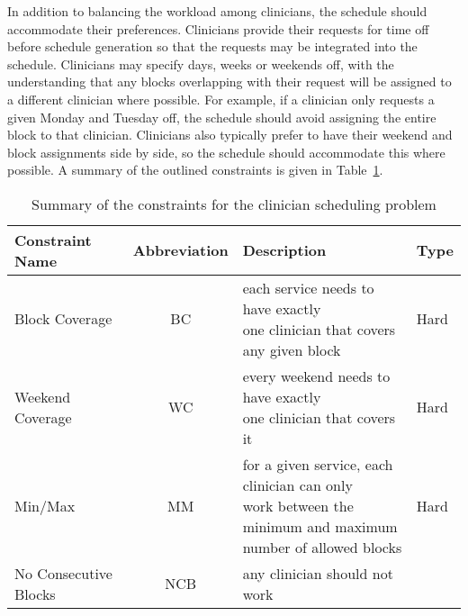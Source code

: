In addition to balancing the workload among clinicians, the schedule
should accommodate their preferences. Clinicians provide their requests for
time off before schedule generation so that the requests may be integrated
into the schedule. Clinicians may specify days, weeks or weekends off, with the
understanding that any blocks overlapping with their request will be assigned to
a different clinician where possible. For example, if a clinician only requests
a given Monday and Tuesday off, the schedule should avoid assigning the
entire block to that clinician. Clinicians also typically prefer to have their weekend and
block assignments side by side, so the schedule should accommodate this where possible.
A summary of the outlined constraints is given in
Table~\ref{tbl:constraint-summary}.

\begin{table}[h]
	\centering
	\caption{Summary of the constraints for the clinician scheduling problem}%
  \label{tbl:constraint-summary}
	\begin{tabular}{ l c l l }
		\toprule
		\textbf{Constraint Name} & \textbf{Abbreviation} & \textbf{Description}                                                                                                                 & \textbf{Type} \\ \midrule
		Block Coverage                                                                  & BC                    & \makecell[l]{each service needs to have
			exactly \\ one clinician that covers any given block}                                     & Hard          \\ \hline
		Weekend Coverage                                                                & WC                    & \makecell[l]{every weekend needs to have
			exactly \\ one clinician that covers it}                                                 & Hard          \\ \hline
		Min/Max                                                                         & MM                    & \makecell[l]{for a given service, each
			clinician can only \\ work between the minimum and maximum \\ number of allowed
			blocks} & Hard          \\ \hline
		No Consecutive Blocks                                                           & NCB                   & \makecell[l]{any clinician should not work \\
}
\end{tabular}
\end{table}
